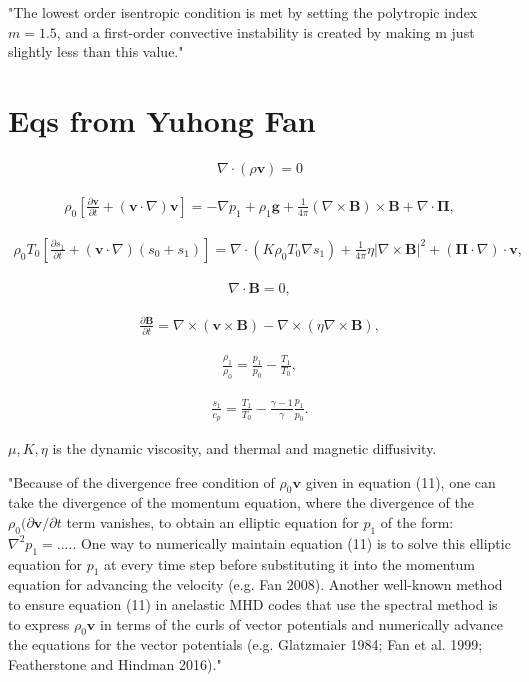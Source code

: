 \documentclass{article}
\begin{document}
"The lowest order isentropic condition is met by setting the polytropic index $m=1.5$, and a first-order convective instability is created by making m just slightly less than this value."


\section{Eqs from Yuhong Fan}

\begin{align}
    \nabla\cdot(\rho\mathbf{v})=0
\end{align}

\begin{align}
    \rho_0\left[\frac{\partial\mathbf{v}}{\partial t}+(\mathbf{v}\cdot\nabla)\mathbf{v}\right]=-\nabla p_1 + \rho_1\mathbf{g} + \frac{1}{4\pi} (\nabla\times\mathbf{B})\times\mathbf{B}+\nabla\cdot\mathbf{\Pi},
\end{align}

\begin{align}
    \rho_0 T_0 \left[\frac{\partial s_1}{\partial t} + (\mathbf{v}\cdot \nabla)(s_0+s_1) \right]
    = \nabla\cdot(K\rho_0T_0\nabla s_1) +\frac{1}{4\pi}\eta |\nabla\times\mathbf{B}|^2 + (\mathbf{\Pi}\cdot\nabla)\cdot\mathbf{v},
\end{align}

\begin{align}
    \nabla\cdot\mathbf{B}=0,
\end{align}

\begin{align}
    \frac{\partial\mathbf{B}}{\partial t} = \nabla\times(\mathbf{v}\times\mathbf{B})-\nabla\times(\eta\nabla\times\mathbf{B}),
\end{align}

\begin{align}
    \frac{\rho_1}{\rho_0} = \frac{p_1}{p_0} - \frac{T_1}{T_0},
\end{align}

\begin{align}
    \frac{s_1}{c_p} = \frac{T_1}{T_0} - \frac{\gamma-1}{\gamma}\frac{p_1}{p_0}.
\end{align}

$\mu,K,\eta$ is the dynamic viscosity, and thermal and magnetic diffusivity.


"Because of the divergence free condition of $\rho_0\mathbf{v}$ given in equation (11), one can take the divergence of the momentum equation, where the divergence of the $\rho_0(\partial\mathbf{v}/\partial t$ term vanishes, to obtain an elliptic equation for $p_1$ of the form: $\nabla^2 p_1=....$. One way to numerically maintain equation (11) is to solve this elliptic equation for $p_1$ at every time step before substituting it into the momentum equation for advancing the velocity (e.g. Fan 2008). Another well-known method to ensure equation (11) in anelastic MHD codes that use the spectral method is to express $\rho_0\mathbf{v}$ in terms of the curls of vector potentials and numerically advance the equations for the vector potentials (e.g. Glatzmaier 1984; Fan et al. 1999; Featherstone and Hindman 2016)."
\end{document}
